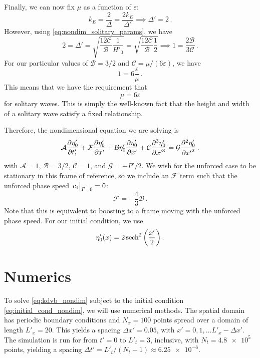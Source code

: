 \documentclass{jfm}
\renewcommand*{\epsilon}{\varepsilon}
\begin{document}
Finally, we can now fix $\mu$ as a function of $\epsilon$:
\begin{equation}
  k_E = \frac{2}{\Delta} = \frac{2 k_E}{\Delta'}
  \implies \Delta' = 2 \,.
\end{equation}
However, using \cref{eq:nondim_solitary_params}, we have
\begin{equation}
  2 = \Delta ' = \sqrt{\frac{12 \mathcal{C}}{\mathcal{B}}
    \frac{1}{H'_0}}
  = \sqrt{\frac{12 \mathcal{C}}{\mathcal{B}} \frac{1}{2}}
  \implies 1 = \frac{2 \mathcal{B}}{3 \mathcal{C}} \,.
\end{equation}
For our particular values of $\mathcal{B} = 3/2$ and $\mathcal{C} =
\mu/(6 \epsilon)$, we have
\begin{equation}
  1 = 6 \frac{\epsilon}{\mu} \,.
\end{equation}
This means that we have the requirement that
\begin{equation}
  \mu = 6 \epsilon
\end{equation}
for solitary waves.
This is simply the well-known fact that the height and width of a
solitary wave satisfy a fixed relationship.

Therefore, the nondimensional equation we are solving is
\begin{equation}
  \mathcal{A} \pdv{\eta'_0}{t'_1} + \mathcal{F} \pdv{\eta'_0}{x'} + \mathcal{B}
  \eta'_0 \pdv{\eta'_0}{x'} + \mathcal{C} \pdv[3]{\eta'_0}{{x'}} =
  \mathcal{G} \pdv[2]{\eta'_0}{{x'}} \,.
  \label{eq:kdvb_nondim}
\end{equation}
with $\mathcal{A} = 1$, $\mathcal{B} = 3/2$, $\mathcal{C} = 1$, and
$\mathcal{G} = -P'/2$.
We wish for the unforced case to be stationary in this frame of
reference, so we include an $\mathcal{F}$ term such that the unforced
phase speed $\eval{c_1}_{P=0} = 0$:
\begin{equation}
  \mathcal{F} = -\frac{4}{3} \mathcal{B} \,.
\end{equation}
Note that this is equivalent to boosting to a frame moving with the
unforced phase speed.
For our initial condition, we use
\begin{equation}
  \eta'_0(x) = 2 \sech^2\pqty{\frac{x'}{2}} \,.
  \label{eq:initial_cond_nondim}
\end{equation}

\section{Numerics}
To solve \cref{eq:kdvb_nondim} subject to the initial condition
\cref{eq:initial_cond_nondim}, we will use numerical methods.
The spatial domain has periodic boundary conditions and $N_x = 100$
points spread over a domain of length $L'_x = 20$.
This yields a spacing $\Delta x' = 0.05$, with $x' = 0, 1, \ldots L'_x -
\Delta x'$.
The simulation is run for from $t'= 0$ to $L'_t = 3$, inclusive, with
$N_t = \num{4.8e5}$ points, yielding a spacing $\Delta t' = L'_t/(N_t-1)
\approx \num{6.25e-6}$.
\end{document}

